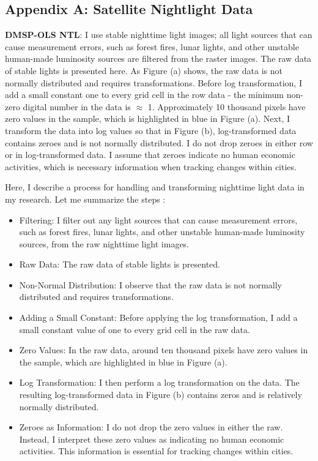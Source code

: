 \documentclass[12pt]{article}    %
\begin{document}
\subsection {Appendix A: Satellite Nightlight Data}
\par  \textbf{DMSP-OLS NTL}: I use stable nighttime light images; all light sources that can cause measurement errors, such as forest fires, lunar lights, and other unstable human-made luminosity sources are filtered from the raster images. The raw data of stable lights is presented here. As Figure (a) shows, the raw  data is not normally distributed and requires transformations. Before log transformation, I  add a small constant one to every grid cell in the row data - the minimum non-zero digital number in the data is $\approx$ 1. Approximately 10 thousand pixels have zero values in the sample, which is highlighted in blue in Figure (a). Next, I transform the data into log values so that in Figure (b), log-transformed data contains zeroes and is not normally distributed.   I do not drop zeroes in either row or in log-transformed data. I assume that zeroes indicate no human economic activities, which is necessary information when tracking changes  within cities. 

\par Here, I describe a process for handling and transforming nighttime light data in my research. Let me summarize the steps :
\begin{itemize}
\item Filtering: I filter out any light sources that can cause measurement errors, such as forest fires, lunar lights, and other unstable human-made luminosity sources, from the raw nighttime light images.
\item Raw Data: The raw data of stable lights is presented.
\item Non-Normal Distribution: I observe that the raw data is not normally distributed and requires transformations.
\item Adding a Small Constant: Before applying the log transformation, I add a small constant value of one to every grid cell in the raw data.
\item Zero Values: In the raw data, around ten thousand pixels have zero values in the sample, which are highlighted in blue in Figure (a).
\item Log Transformation: I then perform a log transformation on the data. The resulting log-transformed data in Figure (b) contains zeros and is relatively normally distributed.
\item Zeroes as Information: I do not drop the zero values in either the raw. Instead, I interpret these zero values as indicating no human economic activities. This information is essential for tracking changes within cities.
\end{itemize}
\end{document}

